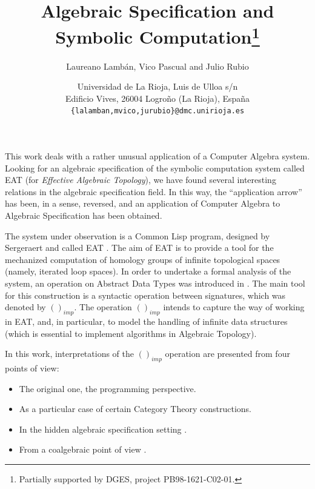 \documentclass[11pt]{article}   %
\begin{document}
\sloppy

\title{Algebraic Specification and Symbolic Computation\thanks{Partially
supported by DGES, project PB98-1621-C02-01.}}





\author{Laureano Lamb\'an, Vico Pascual and Julio Rubio}


\date{Universidad de La Rioja, Luis de Ulloa s/n\\ Edificio Vives,
26004 Logro\~no (La Rioja), Espa\~na\\
 \tt \{lalamban,mvico,jurubio\}@dmc.unirioja.es}

\maketitle

This work deals with a rather unusual application of a Computer
Algebra system. Looking for an algebraic specification of the
symbolic computation system called EAT (for {\it Effective
Algebraic Topology}), we have found several interesting relations
in the algebraic specification field. In this way, the
``application arrow'' has been, in a sense, reversed, and an
application of Computer Algebra to Algebraic Specification has
been obtained.

The system under observation is a Common Lisp program, designed by
Sergeraert and called EAT \cite{EAT}. The aim of EAT is to provide
a tool for the mechanized computation of homology groups of
infinite topological spaces (namely, iterated loop spaces). In
order to undertake a formal analysis of the system, an operation
on Abstract Data Types was introduced in \cite{ISSAC99}. The main
tool for this construction is a syntactic operation between
signatures, which was denoted by $()_{imp}$. The operation
$()_{imp}$ intends to capture the way of working in EAT, and, in
particular, to model the handling of infinite data structures
(which is essential to implement algorithms in Algebraic
Topology).

In this work, interpretations of the $()_{imp}$ operation are
presented from four points of view:

\begin{itemize}

\item The original one, the programming perspective.

\item As a particular case of certain Category Theory constructions.

\item In the hidden algebraic specification setting \cite{Hidden}.

\item From a coalgebraic point of view \cite{Coalg}.

\end{itemize}
\end{document}
